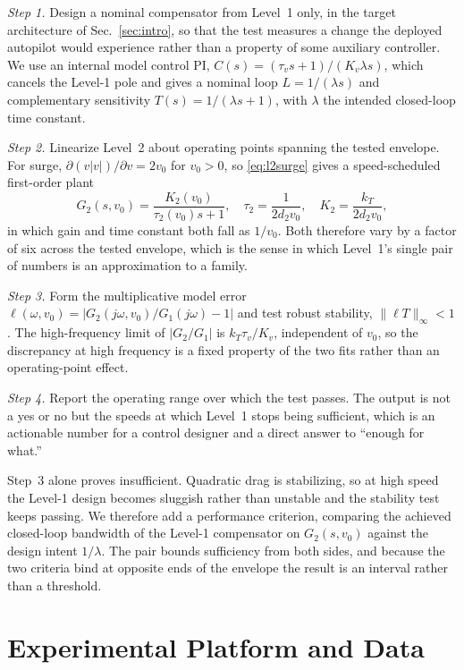 \documentclass[conference]{IEEEtran}
\begin{document}
\emph{Step 1.} Design a nominal compensator from Level~1 only, in the target architecture of Sec.~\ref{sec:intro}, so that the test measures a change the deployed autopilot would experience rather than a property of some auxiliary controller. We use an internal model control PI, $C(s) = (\tau_v s + 1)/(K_v \lambda s)$, which cancels the Level-1 pole and gives a nominal loop $L = 1/(\lambda s)$ and complementary sensitivity $T(s) = 1/(\lambda s + 1)$, with $\lambda$ the intended closed-loop time constant.

\emph{Step 2.} Linearize Level~2 about operating points spanning the tested envelope. For surge, $\partial(v|v|)/\partial v=2v_0$ for $v_0>0$, so \eqref{eq:l2surge} gives a speed-scheduled first-order plant
\begin{equation}
G_2(s,v_0)=\frac{K_2(v_0)}{\tau_2(v_0)s+1},\quad
\tau_2=\frac{1}{2d_2v_0},\quad K_2=\frac{k_T}{2d_2v_0},
\label{eq:lin}
\end{equation}
in which gain and time constant both fall as $1/v_0$. Both therefore vary by a factor of six across the tested envelope, which is the sense in which Level~1's single pair of numbers is an approximation to a family.

\emph{Step 3.} Form the multiplicative model error $\ell(\omega,v_0)=|G_2(j\omega,v_0)/G_1(j\omega)-1|$ and test robust stability, $\|\ell T\|_\infty<1$. The high-frequency limit of $|G_2/G_1|$ is $k_T\tau_v/K_v$, independent of $v_0$, so the discrepancy at high frequency is a fixed property of the two fits rather than an operating-point effect.

\emph{Step 4.} Report the operating range over which the test passes. The output is not a yes or no but the speeds at which Level~1 stops being sufficient, which is an actionable number for a control designer and a direct answer to ``enough for what.''

Step~3 alone proves insufficient. Quadratic drag is stabilizing, so at high speed the Level-1 design becomes sluggish rather than unstable and the stability test keeps passing. We therefore add a performance criterion, comparing the achieved closed-loop bandwidth of the Level-1 compensator on $G_2(s,v_0)$ against the design intent $1/\lambda$. The pair bounds sufficiency from both sides, and because the two criteria bind at opposite ends of the envelope the result is an interval rather than a threshold.

\section{Experimental Platform and Data}
\label{sec:experiment}
\end{document}
